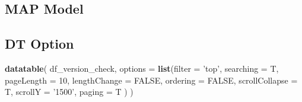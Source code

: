 \documentclass[]{book}
\newenvironment{Shaded}{\begin{snugshade}}{\end{snugshade}}
\newcommand{\KeywordTok}[1]{\textcolor[rgb]{0.13,0.29,0.53}{\textbf{#1}}}
\newcommand{\DataTypeTok}[1]{\textcolor[rgb]{0.13,0.29,0.53}{#1}}
\newcommand{\DecValTok}[1]{\textcolor[rgb]{0.00,0.00,0.81}{#1}}
\newcommand{\StringTok}[1]{\textcolor[rgb]{0.31,0.60,0.02}{#1}}
\newcommand{\OtherTok}[1]{\textcolor[rgb]{0.56,0.35,0.01}{#1}}
\newcommand{\ControlFlowTok}[1]{\textcolor[rgb]{0.13,0.29,0.53}{\textbf{#1}}}
\newcommand{\OperatorTok}[1]{\textcolor[rgb]{0.81,0.36,0.00}{\textbf{#1}}}
\newcommand{\NormalTok}[1]{#1}
\theoremstyle{definition}
\theoremstyle{definition}
\theoremstyle{definition}
\theoremstyle{remark}
\begin{document}
\subsection{MAP Model}\label{map-model}

\begin{Shaded}
\end{Shaded}

\subsection{DT Option}\label{dt-option}

\begin{Shaded}
\begin{Highlighting}[]
\KeywordTok{datatable}\NormalTok{(}
\NormalTok{  df_version_check,}
  \DataTypeTok{options =} \KeywordTok{list}\NormalTok{(}\DataTypeTok{filter =} \StringTok{'top'}\NormalTok{,}
                 \DataTypeTok{searching =}\NormalTok{ T,}
                 \DataTypeTok{pageLength =} \DecValTok{10}\NormalTok{, }\DataTypeTok{lengthChange =} \OtherTok{FALSE}\NormalTok{, }\DataTypeTok{ordering =} \OtherTok{FALSE}\NormalTok{,}
                 \DataTypeTok{scrollCollapse =}\NormalTok{ T,}
                 \DataTypeTok{scrollY =} \StringTok{'1500'}\NormalTok{,}
                 \DataTypeTok{paging =}\NormalTok{ T}
\NormalTok{                 )}
\NormalTok{  )}
\end{Highlighting}
\end{Shaded}
\end{document}
